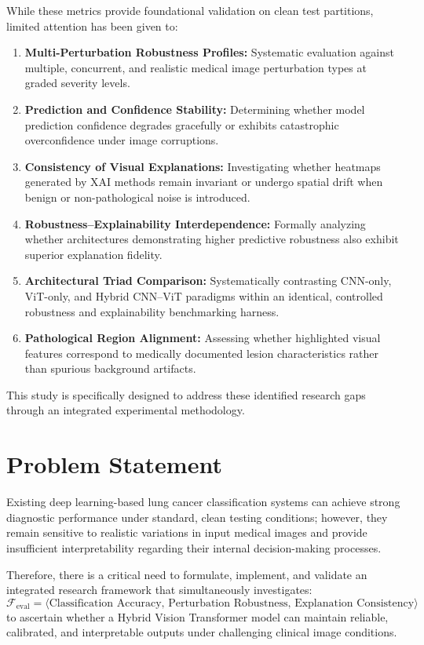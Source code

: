 \documentclass[conference]{IEEEtran}
\begin{document}
While these metrics provide foundational validation on clean test partitions, limited attention has been given to:
\begin{enumerate}
    \item \textbf{Multi-Perturbation Robustness Profiles:} Systematic evaluation against multiple, concurrent, and realistic medical image perturbation types at graded severity levels.
    \item \textbf{Prediction and Confidence Stability:} Determining whether model prediction confidence degrades gracefully or exhibits catastrophic overconfidence under image corruptions.
    \item \textbf{Consistency of Visual Explanations:} Investigating whether heatmaps generated by XAI methods remain invariant or undergo spatial drift when benign or non-pathological noise is introduced.
    \item \textbf{Robustness--Explainability Interdependence:} Formally analyzing whether architectures demonstrating higher predictive robustness also exhibit superior explanation fidelity.
    \item \textbf{Architectural Triad Comparison:} Systematically contrasting CNN-only, ViT-only, and Hybrid CNN--ViT paradigms within an identical, controlled robustness and explainability benchmarking harness.
    \item \textbf{Pathological Region Alignment:} Assessing whether highlighted visual features correspond to medically documented lesion characteristics rather than spurious background artifacts.
\end{enumerate}

This study is specifically designed to address these identified research gaps through an integrated experimental methodology.

\section{Problem Statement}
\label{sec:problem_statement}

Existing deep learning-based lung cancer classification systems can achieve strong diagnostic performance under standard, clean testing conditions; however, they remain sensitive to realistic variations in input medical images and provide insufficient interpretability regarding their internal decision-making processes. 

Therefore, there is a critical need to formulate, implement, and validate an integrated research framework that simultaneously investigates:
\begin{equation}
\mathcal{F}_{\text{eval}} = \Big\langle \text{Classification Accuracy},\, \text{Perturbation Robustness},\, \text{Explanation Consistency} \Big\rangle
\end{equation}
to ascertain whether a Hybrid Vision Transformer model can maintain reliable, calibrated, and interpretable outputs under challenging clinical image conditions.
\end{document}
